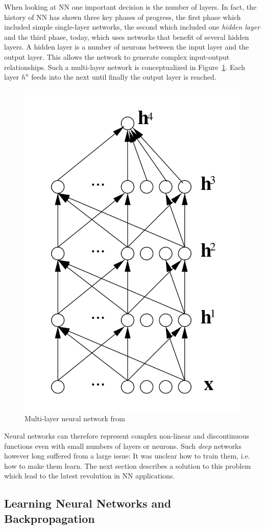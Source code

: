 When looking at \ac{NN} one important decision is the number of layers. In fact, the history of \acl{NN} has shown
three key phases of progress, the first phase which included simple single-layer networks, the second which included one
\emph{hidden layer} and the third phase, today, which uses networks that benefit of several hidden layers. A hidden
layer is a number of neurons between the input layer and the output layer. This allows the network to generate complex
input-output relationships. Such a multi-layer network is conceptualized in Figure~\ref{fig:multilayernn}. Each layer
$h^n$ feeds into the next until finally the output layer is reached.

\begin{figure}[]
    \centering
    \includegraphics[width=0.3\linewidth]{img/multilayer_nn.png}
    \caption{Multi-layer neural network from \cite[]{bengio2009learning} }
    \label{fig:multilayernn}
\end{figure}

Neural networks can therefore represent complex non-linear and discontinuous functions
\cite[p.732]{russell2016artificial} even with small numbers of layers or neurons. Such \emph{deep} networks however long
suffered from a large issue: It was unclear how to train them, i.e. how to make them learn. The next section describes a
solution to this problem which lead to the latest revolution in \ac{NN} applications.

\subsection{Learning Neural Networks and Backpropagation}
\label{sec:Backpropagation}





